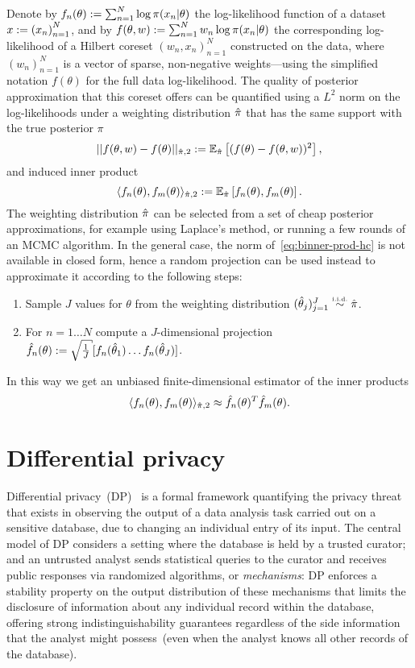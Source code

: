 Denote by $ f_n(\theta) := \sum_{n=1}^{N} \log\pi(x_n|\theta) $ the log-likelihood function of a dataset $x := {(x_n)}_{n=1}^{N}$, and by $ f(\theta,w) := \sum_{n=1}^{N} w_n\log\pi(x_n|\theta)$ the corresponding log-likelihood of a Hilbert coreset $(w_n, x_n)_{n=1}^{N}$ constructed on the data, where $(w_n)_{n=1}^{N}$ is a vector of sparse, non-negative weights---using the simplified notation $f(\theta)$ for the full data log-likelihood. The quality of posterior approximation that this coreset offers can be quantified using a $L^2$ norm on the log-likelihoods under a weighting distribution $\hat{\pi}$ that has the same support with the true posterior $\pi$ 
\[
||f(\theta, w) - f(\theta)||_{\hat{\pi},2} := \mathbb{E}_{\hat{\pi}} \left[ (f(\theta) - f(\theta, w))^2\right],
\]
and induced inner product
\[
\label{eq:binner-prod-hc}
\langle f_n(\theta), f_m(\theta) \rangle_{\hat{\pi}, 2} := \mathbb{E}_{\hat{\pi}}\left[f_n(\theta), f_m(\theta)\right].
\]
The weighting distribution $\hat{\pi}$ can be selected from a set of cheap posterior approximations, for example using Laplace's method, or running a few rounds of an MCMC algorithm. In the general case, the norm of~\cref{eq:binner-prod-hc} is not available in closed form, hence a random projection can be used instead to approximate it according to the following steps:
\begin{enumerate}
	\item Sample $J$ values for $\theta$ from the weighting distribution $(\htheta_j)_{j=1}^{J} \distiid \hpi$.
	\item For $n=1 \ldots N$ compute a $J$-dimensional projection $ \hf_n(\theta) \defined \sqrt{\frac{1}{J}}[f_n(\htheta_1) \ldots f_n(\htheta_J)]$.
\end{enumerate}
In this way we get an unbiased finite-dimensional estimator of the inner products
\[
\langle f_n(\theta), f_m(\theta) \rangle_{\hat{\pi}, 2}  \approx \hat{f}_n(\theta)^T \hat{f}_m(\theta).
\]


\section{Differential privacy}
\label{sec:bdp}

Differential privacy~(DP)~\citep{dwork2006calibrating,dwork14} is a formal framework quantifying the privacy threat that exists in observing the output of a data analysis task carried out on a sensitive database, due to changing an individual entry of its input. The central model of DP considers a setting where the database is held by a trusted curator; and an untrusted analyst sends statistical queries to the curator and receives public responses via randomized algorithms, or \emph{mechanisms}: DP enforces a stability property on the output distribution of these mechanisms that limits the disclosure of information about any individual record within the database, offering strong indistinguishability guarantees regardless of the side information that the analyst might possess~(even when the analyst knows all other records of the database). 

